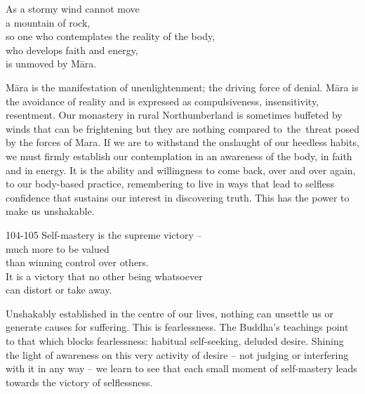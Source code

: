 
\begin{dhpVerse}{8}
\label{dhp-8}
As a stormy wind cannot move\\
a mountain of rock,\\
so one who contemplates the reality of the body,\\
who develops faith and energy,\\
is unmoved by Māra.
\end{dhpVerse}

\begin{dhpRefl}

Māra is the manifestation of unenlightenment; the driving force of
denial. Māra is the avoidance of reality and is expressed as
compulsiveness, insensitivity, resentment. Our monastery in rural
Northumberland is sometimes buffeted by winds that can be frightening
but they are nothing compared to the threat posed by the forces of
Mara. If we are to withstand the onslaught of our heedless habits, we
must firmly establish our contemplation in an awareness of the body,
in faith and in energy. It is the ability and willingness to come
back, over and over again, to our body-based practice, remembering to
live in ways that lead to selfless confidence that sustains our
interest in discovering truth. This has the power to make us
unshakable.

\end{dhpRefl}


\begin{dhpVerse}{104-105}
\label{dhp-104}\label{dhp-105}
Self-mastery is the supreme victory --\\
much more to be valued\\
than winning control over others.\\
It is a victory that no other being whatsoever\\
can distort or take away.
\end{dhpVerse}

\begin{dhpRefl}

Unshakably established in the centre of our lives, nothing can
unsettle us or generate causes for suffering. This is fearlessness.
The Buddha's teachings point to that which blocks fearlessness:
habitual self-seeking, deluded desire. Shining the light of awareness
on this very activity of desire -- not judging or interfering with it
in any way -- we learn to see that each small moment of self-mastery
leads towards the victory of selflessness.

\end{dhpRefl}

